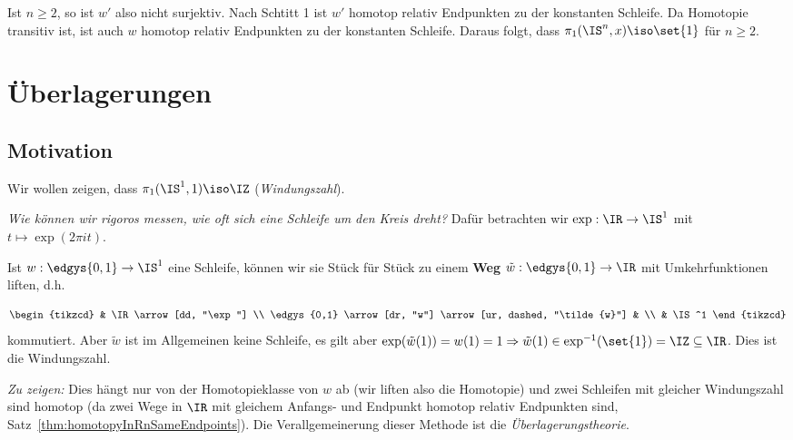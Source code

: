 \documentclass[language=ngerman]{TemplateLecture} %
\begin{document}
Ist $n \geq 2$, so ist $w'$ also nicht surjektiv. Nach Schtitt 1 ist $w'$ homotop relativ Endpunkten zu der konstanten Schleife. Da Homotopie transitiv ist, ist auch $w$ homotop relativ Endpunkten zu der konstanten Schleife. Daraus folgt, dass $\pi_1(\IS^n, x) \iso \set{1}$ für $n \geq 2$.


\chapter{Überlagerungen}

\section*{Motivation}
Wir wollen zeigen, dass $\pi_1(\IS^1, 1) \iso \IZ$ (\emph{Windungszahl}).

\emph{Wie können wir rigoros messen, wie oft sich eine Schleife um den Kreis dreht?} Dafür betrachten wir $\exp: \IR \to \IS^1$ mit $t \mapsto \exp(2\pi i t)$.

Ist $w: \edgys{0,1} \to \IS^1$ eine Schleife, können wir sie Stück für Stück zu einem \textbf{Weg} $\tilde{w}: \edgys{0,1} \to \IR$ mit Umkehrfunktionen liften, d.h. 

\begin{equation*}
    \begin{tikzcd}
        & \IR \arrow[dd, "\exp"] \\
        \edgys{0,1} \arrow[dr, "w"] \arrow[ur, dashed, "\tilde{w}"]   &  \\
                                            & \IS^1
    \end{tikzcd}
\end{equation*}
kommutiert. Aber $\tilde{w}$ ist im Allgemeinen keine Schleife, es gilt aber $\exp(\tilde{w}(1)) = w(1) = 1 \Rightarrow \tilde{w}(1) \in \exp^{-1}(\set{1}) = \IZ \subseteq \IR$. Dies ist die Windungszahl.

\emph{Zu zeigen:} Dies hängt nur von der Homotopieklasse von $w$ ab (wir liften also die Homotopie) und zwei Schleifen mit gleicher Windungszahl sind homotop (da zwei Wege in $\IR$ mit gleichem Anfangs- und Endpunkt homotop relativ Endpunkten sind, Satz~\ref{thm:homotopyInRnSameEndpoints}). Die Verallgemeinerung dieser Methode ist die \emph{Überlagerungstheorie}.

\end{document}
